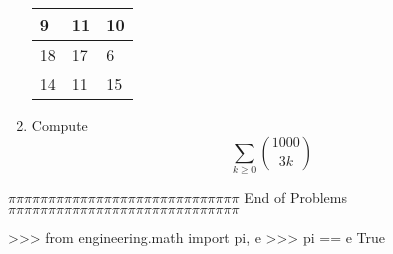\documentclass[a4paper]{article}
\begin{document}
\begin{enumerate}
\begin{table}[h]
    \begin{center}

\begin{tabular}{|l|l|l|}
\hline
9  & 11 & 10 \\ \hline
18 & 17 & 6  \\ \hline
14 & 11 & 15 \\ \hline
\end{tabular}
\end{center}
\end{table}
\item Compute
$$\sum_{k \ge 0} {1000 \choose 3k}$$
\end{enumerate}

\leavevmode
$\pi \pi \pi   \pi\pi \pi \pi \pi \pi \pi\pi \pi
\pi \pi \pi \pi \pi \pi\pi \pi \pi \pi \pi \pi\pi \pi \pi \pi \pi
$ End of Problems
$\pi \pi \pi   \pi\pi \pi \pi \pi \pi \pi\pi \pi
\pi \pi \pi \pi \pi \pi\pi \pi \pi \pi \pi \pi\pi \pi \pi \pi \pi$
\newline
\leavevmode
\newline
\newline
\newline
\newline
\newline
\begin{python}
>>> from engineering.math import pi, e
>>> pi == e
True
\end{python}
\end{document}
